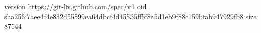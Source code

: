 version https://git-lfs.github.com/spec/v1
oid sha256:7aee4f4e832d55599ea64dbcf4d45535ff5f8a5d1eb9f88c159bfab947929fb8
size 87544

